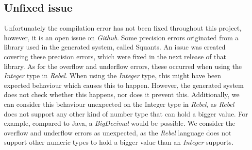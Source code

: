\subsection*{Unfixed issue}
Unfortunately the compilation error has not been fixed throughout this project, however, it is an open issue on \textit{Github}. Some precision errors originated from a library used in the generated system, called Squants. An issue was created covering these precision errors, which were fixed in the next release of that library. As for the overflow and underflow errors, these occurred when using the \textit{Integer} type in \textit{Rebel}. When using the \textit{Integer} type, this might have been expected behaviour which causes this to happen. However, the generated system does not check whether this happens, nor does it prevent this. Additionally, we can consider this behaviour unexpected on the Integer type in
\textit{Rebel}, as \textit{Rebel} does not support any other kind of number type that can hold a bigger value. For example, compared to
Java, a \textit{BigDecimal} would be possible. We consider the overflow and underflow errors as unexpected, as the \textit{Rebel} language does not support other numeric types to hold a bigger value than an \textit{Integer} supports.
